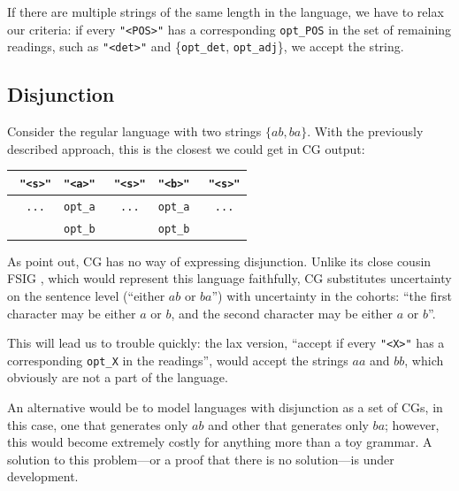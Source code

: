 \documentclass[11pt]{article}
\def\t#1{\texttt{#1}}
\def\h#1{{\tt \color{gray} #1}}
\def\swf{\h{"<s>"}}
\def\maxAmbFSA#1{$\langle \Sigma,S \rangle_#1$}
\begin{document}
If there are multiple strings of the same length in the language,
we have to relax our criteria:
if every \t{"<POS>"} has a corresponding \t{opt\_POS} in the set of remaining readings, 
such as \t{"<det>"} and \{\t{opt\_det}, \t{opt\_adj}\}, we accept the string.

\subsection{Disjunction}

Consider the regular language with two strings $\{ab,ba\}$. 
With the previously described approach, this is the closest we could get in CG output:



\begin{table}[h]
\centering
\begin{tabular}{c|c|c|c|c}
   \swf   &   \t{"<a>"}  &  \swf      & \t{"<b>"}    &  \swf     \\ \hline
  \h{...}  & \t{opt\_a} &  \h{...}    &  \t{opt\_a}  &  \h{...} \\ 
           & \t{opt\_b} &             &  \t{opt\_b}  &            

\end{tabular}
\end{table}

As  point out, CG has no way of expressing disjunction.
Unlike its close cousin FSIG \cite{koskenniemi90}, which would represent this language
faithfully, CG substitutes uncertainty on the sentence level (``either $ab$ or $ba$'')
with uncertainty in the cohorts:
``the first character may be either $a$ or $b$, and the second character may be either $a$ or $b$''.

This will lead us to trouble quickly: the lax version,
``accept if every \t{"<X>"} has a corresponding \t{opt\_X} in the readings'',
would accept the strings $aa$ and $bb$, which obviously are not a part of the language.

An alternative would be to model languages with disjunction as a set of CGs,
in this case, one that generates only $ab$ and other that generates only $ba$;
however, this would become extremely costly for anything more than a toy grammar.
A solution to this problem---or a proof that there is no solution---is under development.




\end{document}
